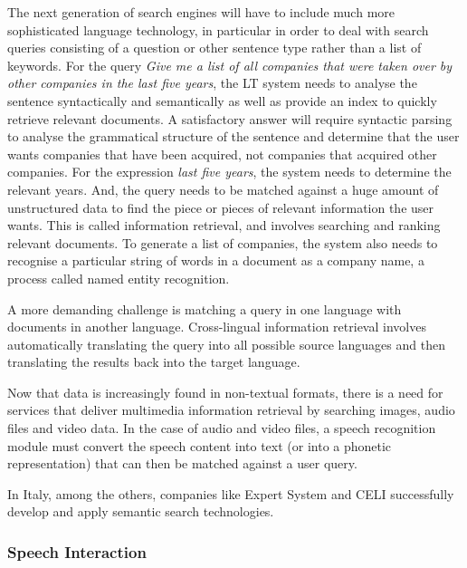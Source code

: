\documentclass[]{../../metanetpaper}
\begin{document}
\begin{multicols}{2}

The next generation of search engines will have to include much more sophisticated language technology, in particular in order to deal with search queries consisting of a question or other sentence type rather than a list of keywords. For the query \emph{Give me a list of all companies that were taken over by other companies in the last five years}, the LT system needs to analyse the sentence syntactically and semantically as well as provide an index to quickly retrieve relevant documents. A satisfactory answer will require syntactic parsing to analyse the grammatical structure of the sentence and determine that the user wants companies that have been acquired, not companies that acquired other companies. For the expression \emph{last five years}, the system needs to determine the relevant years. And, the query needs to be matched against a huge amount of unstructured data to find the piece or pieces of relevant information the user wants. This is called information retrieval, and involves searching and ranking relevant documents. To generate a list of companies, the system also needs to recognise a particular string of words in a document as a company name, a process called named entity recognition.

A more demanding challenge is matching a query in one language with documents
in another language. Cross-lingual information retrieval involves
automatically translating the query into all possible source languages and
then translating the results back into the target language.
 
Now that data is increasingly found in non-textual formats, there is a need
for services that deliver multimedia information retrieval by searching
images, audio files and video data. In the case of audio and video files, a
speech recognition module must convert the speech content into text (or into a
phonetic representation) that can then be matched against a user query.

In Italy, among the others, companies like Expert System and CELI successfully develop and apply semantic search technologies.


\subsubsection{Speech Interaction}



\end{multicols}
\end{document}
